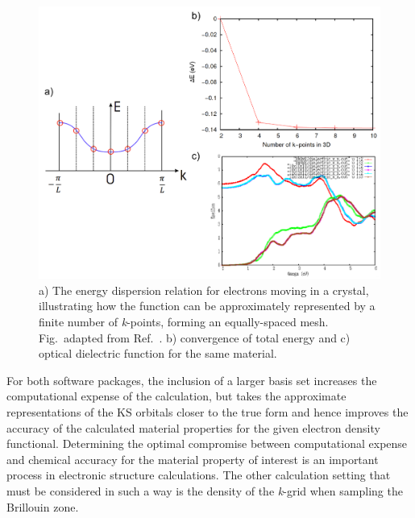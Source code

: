 \documentclass[11pt, twoside]{report}
\begin{document}
\begin{figure}[h!]
  \centering
    \includegraphics[width=1.0\textwidth]{figures/k-point_sampling_update.png}
    \caption[a) The energy dispersion relation for electrons moving in a crystal, illustrating how the function can be approximately represented by a finite number of \textit{k}-points, forming an equally-spaced mesh. b) convergence of total energy and c) optical dielectric function for the same material.]{a) The energy dispersion relation for electrons moving in a crystal, illustrating how the function can be approximately represented by a finite number of \textit{k}-points, forming an equally-spaced mesh. Fig.~adapted from Ref.~. b) convergence of total energy and c) optical dielectric function for the same material.}
  \label{k_sampling}
\end{figure}

For both software packages, the inclusion of a larger basis set increases the computational expense of the calculation, but takes the approximate representations of the KS orbitals closer to the true form and hence improves the accuracy of the calculated material properties for the given electron density functional. Determining the optimal compromise between computational expense and chemical accuracy for the material property of interest is an important process in electronic structure calculations. The other calculation setting that must be considered in such a way is the density of the \textit{k}-grid when sampling the Brillouin zone.
\end{document}
